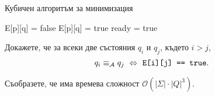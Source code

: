 
\begin{algorithm}[H]
  \caption{Кубичен алгоритъм за минимизация}
  \label{alg:minimisation-cube}
  \begin{algorithmic}[1]
    \State E[p][q] = false 
    \Else
    \State E[p][q] = true 
    \EndIf
    \EndFor
    \EndFor
    \Repeat
    \State ready = true
     
      
     
     
    \EndIf
    \EndFor
    \EndIf
    \EndFor
    \EndFor
     
  \end{algorithmic}
\end{algorithm}

\begin{problem}
  Докажете, че за всеки две състояния $q_i$ и $q_j$, където $i > j$,
  \[q_i \equiv_{\mathcal{A}} q_j \ \Leftrightarrow\  \texttt{E[i][j] == true}.\]
\end{problem}

\begin{problem}
  Съобразете, че  има времева сложност $\mathcal{O}(|\Sigma| \cdot |Q|^3)$.
\end{problem}


